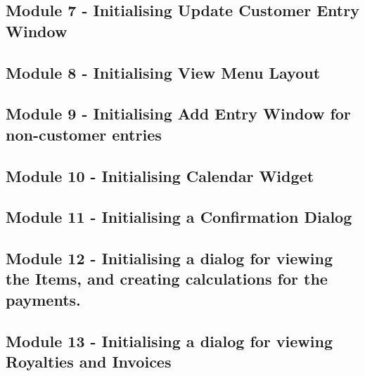 \begin{landscape}
\begin{scriptsize}
\subsection{Module 7 - Initialising Update Customer Entry Window}

 \label{ssec:UpdateEntryWindow.py}

\subsection{Module 8 - Initialising View Menu Layout}


\subsection{Module 9 - Initialising Add Entry Window for non-customer entries}


\subsection{Module 10 - Initialising Calendar Widget}

 \label{ssec:CalendarWidget.py}

\subsection{Module 11 - Initialising a Confirmation Dialog}


\subsection{Module 12 - Initialising a dialog for viewing the Items, and creating calculations for the payments.}

 \label{ssec:Items.py}

\subsection{Module 13 - Initialising a dialog for viewing Royalties and Invoices}


\end{scriptsize}
\end{landscape}
